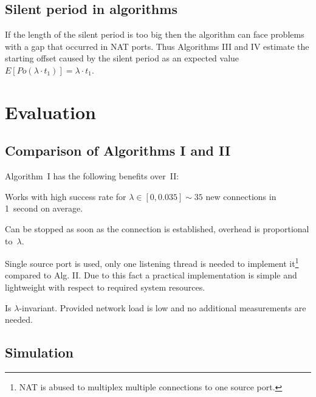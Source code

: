 \documentclass{acm_proc_article-sp}
\begin{document}
% 

\subsection{Silent period in algorithms} If the length of the silent period is too big then
the algorithm can face problems with a gap that occurred in NAT ports. Thus 
Algorithms III and IV estimate the starting offset caused by the silent period as an
expected value $E[Po(\lambda \cdot t_1)] = \lambda\cdot t_1$.

\section{Evaluation}

\subsection{Comparison of Algorithms I and II} 
Algorithm~I has the following benefits over~II:
\begin{compactitem}
 \item Works with high success rate for $\lambda \in [0, 0.035] \sim 35$ new connections in 1~second on average.
 \item Can be stopped as soon as the connection is established, overhead is proportional to~$\lambda$.
 \item Single source port is used, only one listening thread is needed to implement
it\footnote{NAT is abused to multiplex multiple connections to one source port.} compared to Alg. II.
Due to this fact a practical implementation is simple and lightweight with respect to required system resources.
 \item Is $\lambda$-invariant. Provided network load is low and no additional measurements are needed.
\end{compactitem}

\subsection{Simulation}
\end{document}
